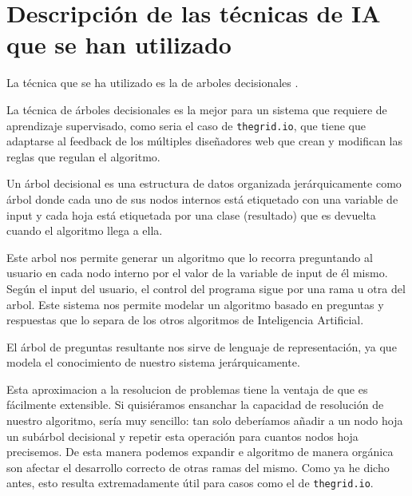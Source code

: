 \section{Descripción de las técnicas de IA que se han utilizado} 
\label{sec:desc_tecnica}

La técnica que se ha utilizado es la de arboles decisionales 
 \cite{10_startups}.

La técnica de árboles decisionales es la mejor para un sistema que 
requiere de aprendizaje supervisado, como seria el caso de
\texttt{thegrid.io}, que tiene que adaptarse al feedback de los múltiples
diseñadores web que crean y modifican las reglas que regulan el algoritmo.

Un árbol decisional es una estructura de datos organizada 
jerárquicamente como árbol donde cada uno de sus nodos internos está
etiquetado con una variable de input y cada hoja está etiquetada por una
clase (resultado) que es devuelta cuando el algoritmo llega a ella.

Este arbol nos permite generar un algoritmo que lo recorra preguntando
al usuario en cada nodo interno por el valor de la variable de input de
él mismo. Según el input del usuario, el control del programa sigue por
una rama u otra del arbol. Este sistema nos permite modelar un algoritmo
basado en preguntas y respuestas que lo separa de los otros algoritmos
de Inteligencia Artificial.

El árbol de preguntas resultante nos sirve de lenguaje de representación, ya
que modela el conocimiento de nuestro sistema jerárquicamente.

Esta aproximacion a la resolucion de problemas tiene la ventaja de que
es fácilmente extensible. Si quisiéramos ensanchar la capacidad de 
resolución de nuestro algoritmo, sería muy sencillo: tan solo deberíamos 
añadir a un nodo hoja un subárbol decisional y repetir esta operación para
cuantos nodos hoja precisemos. De esta manera podemos expandir
e algoritmo de manera orgánica son afectar el desarrollo correcto de otras
ramas del mismo. Como ya he dicho antes, esto resulta extremadamente útil
para casos como el de \texttt{thegrid.io}.
